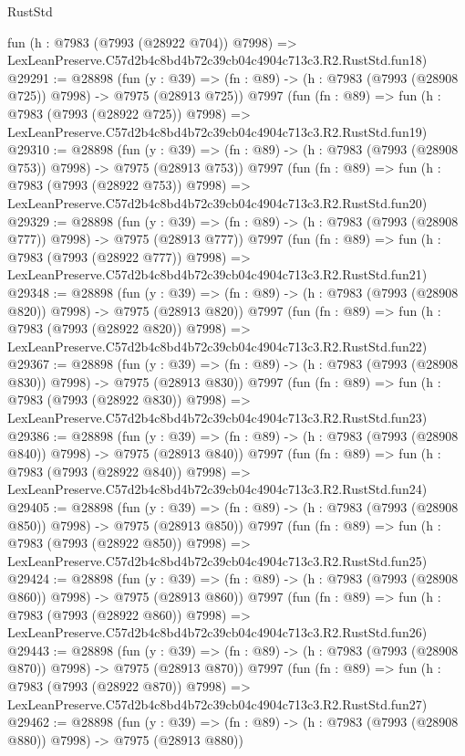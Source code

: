 \begin{lexlean}{RustStd}
\begin{coremodule}
    fun (h : @7983 (@7993 (@28922 @704)) @7998) =>
    LexLeanPreserve.C57d2b4c8bd4b72c39cb04c4904c713c3.R2.RustStd.fun18)
@29291 := @28898
    (fun (y : @39) => (fn : @89) -> (h : @7983 (@7993 (@28908 @725)) @7998) -> @7975 (@28913 @725))
    @7997
    (fun (fn : @89) =>
    fun (h : @7983 (@7993 (@28922 @725)) @7998) =>
    LexLeanPreserve.C57d2b4c8bd4b72c39cb04c4904c713c3.R2.RustStd.fun19)
@29310 := @28898
    (fun (y : @39) => (fn : @89) -> (h : @7983 (@7993 (@28908 @753)) @7998) -> @7975 (@28913 @753))
    @7997
    (fun (fn : @89) =>
    fun (h : @7983 (@7993 (@28922 @753)) @7998) =>
    LexLeanPreserve.C57d2b4c8bd4b72c39cb04c4904c713c3.R2.RustStd.fun20)
@29329 := @28898
    (fun (y : @39) => (fn : @89) -> (h : @7983 (@7993 (@28908 @777)) @7998) -> @7975 (@28913 @777))
    @7997
    (fun (fn : @89) =>
    fun (h : @7983 (@7993 (@28922 @777)) @7998) =>
    LexLeanPreserve.C57d2b4c8bd4b72c39cb04c4904c713c3.R2.RustStd.fun21)
@29348 := @28898
    (fun (y : @39) => (fn : @89) -> (h : @7983 (@7993 (@28908 @820)) @7998) -> @7975 (@28913 @820))
    @7997
    (fun (fn : @89) =>
    fun (h : @7983 (@7993 (@28922 @820)) @7998) =>
    LexLeanPreserve.C57d2b4c8bd4b72c39cb04c4904c713c3.R2.RustStd.fun22)
@29367 := @28898
    (fun (y : @39) => (fn : @89) -> (h : @7983 (@7993 (@28908 @830)) @7998) -> @7975 (@28913 @830))
    @7997
    (fun (fn : @89) =>
    fun (h : @7983 (@7993 (@28922 @830)) @7998) =>
    LexLeanPreserve.C57d2b4c8bd4b72c39cb04c4904c713c3.R2.RustStd.fun23)
@29386 := @28898
    (fun (y : @39) => (fn : @89) -> (h : @7983 (@7993 (@28908 @840)) @7998) -> @7975 (@28913 @840))
    @7997
    (fun (fn : @89) =>
    fun (h : @7983 (@7993 (@28922 @840)) @7998) =>
    LexLeanPreserve.C57d2b4c8bd4b72c39cb04c4904c713c3.R2.RustStd.fun24)
@29405 := @28898
    (fun (y : @39) => (fn : @89) -> (h : @7983 (@7993 (@28908 @850)) @7998) -> @7975 (@28913 @850))
    @7997
    (fun (fn : @89) =>
    fun (h : @7983 (@7993 (@28922 @850)) @7998) =>
    LexLeanPreserve.C57d2b4c8bd4b72c39cb04c4904c713c3.R2.RustStd.fun25)
@29424 := @28898
    (fun (y : @39) => (fn : @89) -> (h : @7983 (@7993 (@28908 @860)) @7998) -> @7975 (@28913 @860))
    @7997
    (fun (fn : @89) =>
    fun (h : @7983 (@7993 (@28922 @860)) @7998) =>
    LexLeanPreserve.C57d2b4c8bd4b72c39cb04c4904c713c3.R2.RustStd.fun26)
@29443 := @28898
    (fun (y : @39) => (fn : @89) -> (h : @7983 (@7993 (@28908 @870)) @7998) -> @7975 (@28913 @870))
    @7997
    (fun (fn : @89) =>
    fun (h : @7983 (@7993 (@28922 @870)) @7998) =>
    LexLeanPreserve.C57d2b4c8bd4b72c39cb04c4904c713c3.R2.RustStd.fun27)
@29462 := @28898
    (fun (y : @39) => (fn : @89) -> (h : @7983 (@7993 (@28908 @880)) @7998) -> @7975 (@28913 @880))

\end{coremodule}
\end{lexlean}
